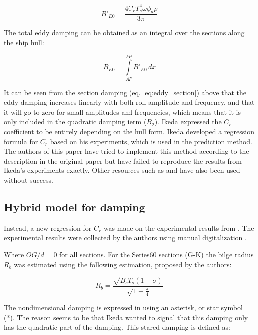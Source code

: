     
\begin{equation}
B'_{E0} = \frac{4 C_{r} T_{s}^{4} \omega \phi_{a} \rho}{3 \pi}
\label{eq:eddy_section}
\end{equation}

    
The total eddy damping can be obtained as an integral over the sections along the ship hull:
 
    
\begin{equation}
B_{E0} = \int\limits_{AP}^{FP} B'_{E0}\, dx
\label{eq:equation}
\end{equation}

    
It can be seen from the section damping (eq. \ref{eq:eddy_section}) above that the eddy damping increases linearly with both roll amplitude and frequency, and that it will go to zero for small amplitudes and frequencies, which means that it is only included in the quadratic damping term ($B_2$). Ikeda expressed the
$C_r$ coefficient to be entirely depending on the hull form. Ikeda developed a regression formula for $C_r$ based on his experiments, which is used in the prediction method. The authors of this paper have tried to implement this method according to the description in the original paper \cite{7505983/4AFVVGNT} but have failed to reproduce the
results from Ikeda's experiments exactly. Other resources such as \cite{7505983/FB64RGPF} and \cite{7505983/KAKIM2E2} have also been used without success.


\subsection*{\textbf{Hybrid model for damping}} \label{subsec:hybrid_formula}
Instead, a new regression for $C_r$ was made on the experimental
results from \cite{7505983/4AFVVGNT}. The experimental results were
collected by the authors using manual digitalization
\cite{7505983/RXYIE6UW}.

Where $OG/d=0$ for all sections. For the Series60 sections (G-K) the bilge radius $R_b$ was estimated using the following estimation, proposed by the authors:
 
\begin{equation}
R_{b} = \frac{\sqrt{B_{s} T_{s} \left(1 - \sigma\right)}}{\sqrt{1 - \frac{\pi}{4}}}
\label{eq:equation}
\end{equation}

    
The nondimensional damping is expressed in \cite{7505983/4AFVVGNT} using an asterisk, or star symbol (*). The reason seems to be that Ikeda wanted to signal that this damping only has the quadratic part of the
damping. This stared damping is defined as:
 

